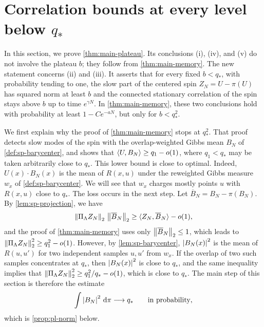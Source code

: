 \chapter{Correlation bounds at every level below \texorpdfstring{$q_*$}{q*}}\label{sec:plateau}

In this section, we prove \cref{thm:main-plateau}. Its conclusions (i), (iv), and (v) do not involve the plateau $b$; they follow from \cref{thm:main-memory}. The new statement concerns (ii) and (iii). It asserts that for every fixed $b<q_*$, with probability tending to one, the slow part of the centered spin $Z_N=U-\pi(U)$ has squared norm at least $b$ and the connected stationary correlation of the spin stays above $b$ up to time $e^{\gamma N}$. In \cref{thm:main-memory}, these two conclusions hold with probability at least $1-Ce^{-aN}$, but only for $b<q_*^2$.

We first explain why the proof of \cref{thm:main-memory} stops at $q_*^2$. That proof detects slow modes of the spin with the overlap-weighted Gibbs mean $B_N$ of \cref{def:sp-barycenter}, and shows that $\langle U,B_N\rangle\ge q_1-o(1)$, where $q_1<q_*$ may be taken arbitrarily close to $q_*$. This lower bound is close to optimal. Indeed, $U(x)\cdot B_N(x)$ is the mean of $R(x,u)$ under the reweighted Gibbs measure $w_x$ of \cref{def:sp-barycenter}. We will see that $w_x$ charges mostly points $u$ with $R(x,u)$ close to $q_*$. The loss occurs in the next step. Let $\overline B_N=B_N-\pi(B_N)$. By \cref{lem:sp-projection}, we have
\[
\left\lVert\Pi_\Lambda Z_N\right\rVert_2\,\left\lVert\overline B_N\right\rVert_2\ge\langle Z_N,\overline B_N\rangle-o(1),
\]
and the proof of \cref{thm:main-memory} uses only $\left\lVert\overline B_N\right\rVert_2\le1$, which leads to $\left\lVert\Pi_\Lambda Z_N\right\rVert_2^2\ge q_1^2-o(1)$. However, by \cref{lem:sp-barycenter}, $\left|B_N(x)\right|^2$ is the mean of $R(u,u')$ for two independent samples $u,u'$ from $w_x$. If the overlap of two such samples concentrates at $q_*$, then $\left|B_N(x)\right|^2$ is close to $q_*$, and the same inequality implies that $\left\lVert\Pi_\Lambda Z_N\right\rVert_2^2\ge q_1^2/q_*-o(1)$, which is close to $q_*$. The main step of this section is therefore the estimate
\[
\int\left|B_N\right|^2\,\mathrm d\pi\longrightarrow q_*\qquad\text{in probability},
\]
which is \cref{prop:pl-norm} below.

